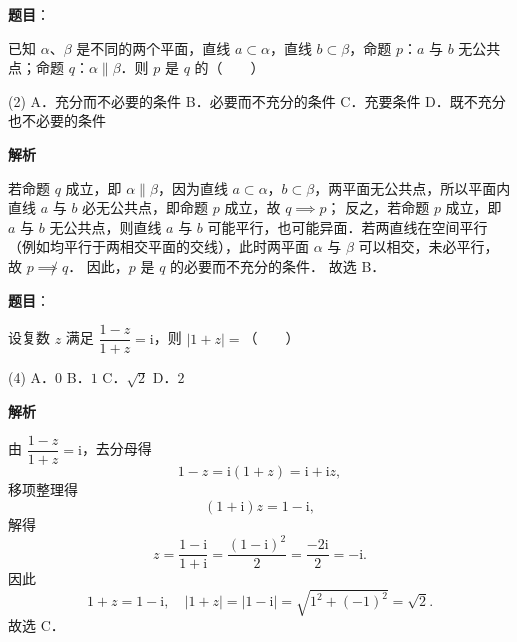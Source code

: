 \begin{answer}

\textbf{题目}：

已知 $\alpha$、$\beta$ 是不同的两个平面，直线 $a \subset \alpha$，直线 $b \subset \beta$，命题 $p$：$a$ 与 $b$ 无公共点；命题 $q$：$\alpha \parallel \beta$．则 $p$ 是 $q$ 的\mbox{（　　）}

\begin{gkopts}(2)
\task A．充分而不必要的条件
\task B．必要而不充分的条件
\task C．充要条件
\task D．既不充分也不必要的条件
\end{gkopts}

\textbf{解析}

若命题 $q$ 成立，即 $\alpha \parallel \beta$，因为直线 $a \subset \alpha$，$b \subset \beta$，两平面无公共点，所以平面内直线 $a$ 与 $b$ 必无公共点，即命题 $p$ 成立，故 $q \implies p$；
反之，若命题 $p$ 成立，即 $a$ 与 $b$ 无公共点，则直线 $a$ 与 $b$ 可能平行，也可能异面．若两直线在空间平行（例如均平行于两相交平面的交线），此时两平面 $\alpha$ 与 $\beta$ 可以相交，未必平行，故 $p \not\implies q$．
因此，$p$ 是 $q$ 的必要而不充分的条件．
故选 B．


\end{answer}
\begin{answer}

\textbf{题目}：

设复数 $z$ 满足 $\dfrac{1-z}{1+z} = \mathrm{i}$，则 $|1+z| =$\mbox{（　　）}

\begin{gkopts}(4)
\task A．$0$
\task B．$1$
\task C．$\sqrt{2}$
\task D．$2$
\end{gkopts}

\textbf{解析}

由 $\dfrac{1-z}{1+z} = \mathrm{i}$，去分母得
\nopagebreak[4]
\[
1 - z = \mathrm{i}(1 + z) = \mathrm{i} + \mathrm{i}z,
\]
移项整理得
\nopagebreak[4]
\[
(1 + \mathrm{i})z = 1 - \mathrm{i},
\]
解得
\nopagebreak[4]
\[
z = \frac{1 - \mathrm{i}}{1 + \mathrm{i}} = \frac{(1 - \mathrm{i})^2}{2} = \frac{-2\mathrm{i}}{2} = -\mathrm{i}.
\]
因此
\nopagebreak[4]
\[
1 + z = 1 - \mathrm{i}, \quad |1 + z| = |1 - \mathrm{i}| = \sqrt{1^2 + (-1)^2} = \sqrt{2}.
\]
故选 C．


\end{answer}
